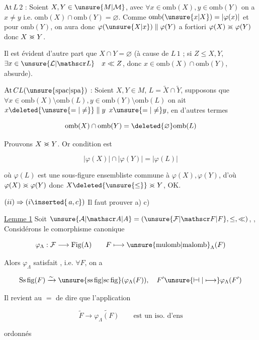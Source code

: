 
$\mathrm{At}\,L\,2$ : Soient $X,Y\in\unsure{M|\mathcal M}$, avec $\forall x\in\mathrm{omb}(X),y\in\mathrm{omb}(Y)$ on a $x\ne y$  i.e. $\mathrm{omb}(X)\cap\mathrm{omb}(Y)=\varnothing$.  Comme $\mathrm{omb}(\unsure{x|X})=\lvert\varphi(x)\rvert$ et  pour $\mathrm{omb}(Y)$, on aura donc $\varphi(\unsure{X|x})\parallel\varphi(Y)$ a fortiori \deleted{$\mathrel{>\mkern-13mu<}$} $\varphi(X)\mathrel{>\mkern-13mu<}\varphi(Y)$ donc $X\mathrel{>\mkern-13mu<}Y$.

Il est évident d'autre part que $X\cap Y=\varnothing$ (à cause de $L\,1$ ; si $Z\leq X,Y$, $\exists x\in\unsure{\mathcal L|\mathscr L}\quad x\ll Z$, donc $x\in\mathrm{omb}(X)\cap\mathrm{omb}(Y)$, absurde).

$\mathrm{At}\,CL(\unsure{\mathrm{spac}|\mathrm{spa}})$ : Soient $X,Y\in M$, $L=\widetilde X\cap\widetilde Y$, supposons que $\forall x\in\mathrm{omb}(X)\setminus\mathrm{omb}(L),y\in\mathrm{omb}(Y)\setminus\mathrm{omb}(L)$ on ait $x\deleted{\unsure{=|\ne}}\parallel y$  $x\unsure{=|\ne}y$, en d'autres termes

\[
\mathrm{omb}(X)\cap\mathrm{omb}(Y)=\deleted{\varnothing}\mathrm{omb}(L)
\]

Prouvons $X\mathrel{>\mkern-13mu<}Y$. Or   condition est

\[
\lvert\varphi(X)\rvert\cap\lvert\varphi(Y)\rvert=\lvert\varphi(L)\rvert
\]

où $\varphi(L)$ est une sous-figure ensembliste commune à $\varphi(X),\varphi(Y)$, d'où $\varphi(X)\mathrel{>\mkern-13mu<}\varphi(Y)$ donc $X\deleted{\unsure{\leq}}\mathrel{>\mkern-13mu<}Y$, OK.

$(ii)\Rightarrow(i\inserted{\,a,c})$ Il faut prouver a)  c)

\uline{Lemme 1} Soit $\unsure{\mathcal A|\mathscr A|A}=(\unsure{\mathcal F|\mathscr F|F},\leq,\ll)$,  ,  Considérons  le comorphisme canonique

\[
\varphi_{\Lambda}:\mathcal F\longrightarrow\mathrm{Fig}(\Lambda)\qquad F\longmapsto\unsure{\mathrm{mulomb}|\mathrm{malomb}}_{\Lambda}(F)
\]


Alors $\varphi_{\Lambda}$ satisfait , i.e. $\forall F$, on a

\[
\mathrm{Ss\,fig}(F)\xrightarrow{\sim}\unsure{\mathrm{ss\,fig}|\mathrm{sc\,fig}}(\varphi_{\Lambda}(F)),\quad F'\unsure{\mathrel{\vdash\mkern-6mu\dashv}|\longmapsto}\varphi_{\Lambda}(F')
\]

Il revient au $=$ de dire que l'application

\[
\widetilde F\longrightarrow\widetilde{\varphi_{\Lambda}(F)}\qquad \text{est un iso. d'ens}
\]

ordonnés

